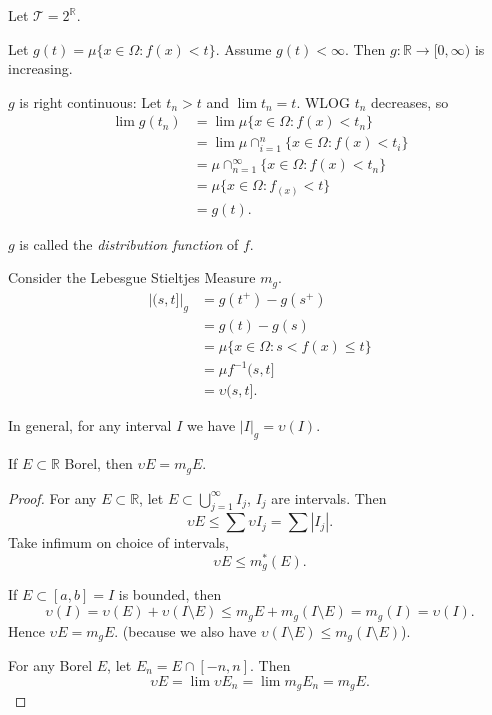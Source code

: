 \begin{example}
	Let $\mathcal{T} = 2^{\mathbb{R}}$.

	Let $g(t) = \mu \{x \in \Omega: f(x) < t\} $. Assume $g(t) < \infty $. Then $g: \mathbb{R} \to  [0, \infty )$ is increasing. 

	$g$ is right continuous: Let $t_n > t$ and $\lim t_n = t$. WLOG $t_n$ decreases, so
	\begin{align*}
		\lim g(t_n) &=  \lim \mu \{x \in \Omega : f(x) < t_n\}  \\
		&= \lim \mu \cap_{i=1}^n \{x \in \Omega :f(x) < t_i\}  \\
		&= \mu \cap _{n=1}^\infty  \{x \in \Omega: f(x) < t_n\}  \\
		&= \mu \{x \in \Omega : f_(x) < t\}  \\
		&= g(t)
	.\end{align*}

	 $g$ is called the \textit{distribution function} of $f$.

	 Consider the Lebesgue Stieltjes Measure $m_g$.
	 \begin{align*}
		 \left| (s, t] \right| _g &= g(t^+) - g(s^+) \\
		 &= g(t) - g(s) \\
		 &= \mu \{x \in \Omega : s < f(x) \le t\}  \\
		 &= \mu f^{-1} (s, t]\\
		 &= \upsilon (s, t]
	 .\end{align*}

	 In general, for any interval $I$ we have $|I|_g = \upsilon(I)$.
\end{example}


\begin{proposition}
	If $E \subset \mathbb{R}$ Borel, then $\upsilon E = m_g E$.
\end{proposition}
\begin{proof}
	For any $E \subset \mathbb{R}$, let $E \subset \bigcup_{j = 1}^{\infty } I_j $, $I_j$ are intervals. Then
	\[
		\upsilon E \le  \sum \upsilon I_j = \sum |I_j|
	.\] 
	Take infimum on choice of intervals,
	\[
		\upsilon E \le  m_g^*(E)
	.\] 

	If $E \subset [a,b] = I$ is bounded, then
	\[
		\upsilon(I) = \upsilon(E) + \upsilon(I \setminus E) \le m_g E + m_g(I \setminus E) = m_g(I) = \upsilon(I)
	.\] 
	Hence $\upsilon E = m_g E$. (because we also have $\upsilon(I \setminus E) \le  m_g(I \setminus E)$).

	For any Borel $E$, let $E_n = E \cap [-n, n]$. Then
	\[
		\upsilon E = \lim \upsilon E_n = \lim m_g E_n = m_g E
	.\] 
\end{proof}

